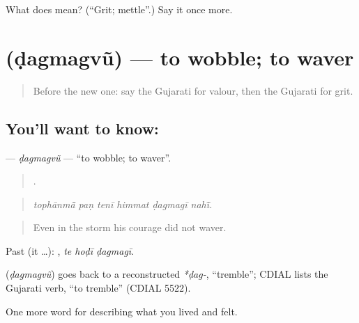 \begin{tcolorbox}[breakable,colback=teal!4,colframe=teal!35!black,title={Before you move on}]
What does  mean? (\textquotedblleft{}Grit; mettle\textquotedblright{}.) Say it once more.
\end{tcolorbox}
\section[\texorpdfstring{\gu{ડગમગવું} (ḍagmagvũ)}{ડગમગવું (ḍagmagvũ)}]{ (ḍagmagvũ) — to wobble; to waver}

\label{lesson:GU-C466-dagmagvu}



\begin{quote}
Before the new one: say the Gujarati for valour, then the Gujarati for grit.
\end{quote}

\subsection*{You'll want to know: }
\textbf{} — \emph{ḍagmagvũ} — \textquotedblleft{}to wobble; to waver\textquotedblright{}.

\begin{quote}
     .
\end{quote}

\begin{quote}
\emph{tophānmā̃ paṇ tenī himmat ḍagmagī nahī̃.}
\end{quote}

\begin{quote}
Even in the storm his courage did not waver.
\end{quote}

Past (it …):   , \emph{te hoḍī ḍagmagī}.

\begin{cousinweb}
\textbf{} (\emph{ḍagmagvũ}) goes back to a reconstructed \emph{*ḍag-}, \textquotedblleft{}tremble\textquotedblright{}; CDIAL lists the Gujarati verb, \textquotedblleft{}to tremble\textquotedblright{} (CDIAL 5522).
\end{cousinweb}

\begin{grammarlens}[title={What you've built}]
One more word for describing what you lived and felt.
\end{grammarlens}

